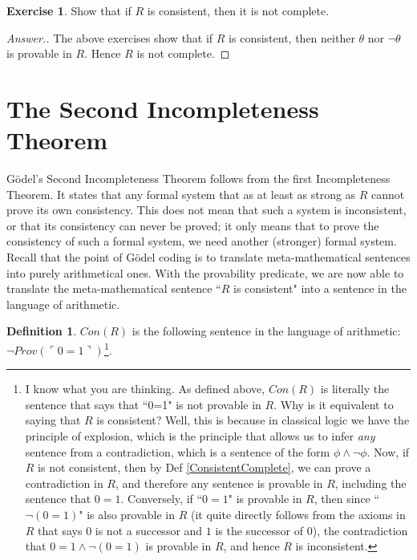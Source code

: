 \documentclass[11pt]{article}
\theoremstyle{definition}
\newtheorem{defn}{Definition}
\newtheorem{exer}{Exercise}
\begin{document}
\begin{exer}
Show that if $R$ is consistent, then it is not complete.
\end{exer}

\begin{proof}[Answer.]
The above exercises show that if $R$ is consistent, then neither $\theta$ nor $\neg \theta$ is provable in $R$. Hence $R$ is not complete.

\end{proof}

\section{The Second Incompleteness Theorem}

G\"odel's Second Incompleteness Theorem follows from the first Incompleteness Theorem. It states that any formal system that as at least as strong as $R$ cannot prove its own consistency. This does not mean that such a system is inconsistent, or that its consistency can never be proved; it only means that to prove the consistency of such a formal system, we need another (stronger) formal system. \\

Recall that the point of G\"odel coding is to translate meta-mathematical sentences into purely arithmetical ones. With the provability predicate, we are now able to translate the meta-mathematical sentence ``$R$ is consistent" into a sentence in the language of arithmetic.

\begin{defn}
$Con(R)$ is the following sentence in the language of arithmetic: $\neg Prov(\ulcorner 0 = 1 \urcorner)$\footnote{I know what you are thinking. As defined above, $Con(R)$ is literally the sentence that says that ``0=1" is not provable in $R$. Why is it equivalent to saying that $R$ is consistent? Well, this is because in classical logic we have the principle of explosion, which is the principle that allows us to infer \textit{any} sentence from a contradiction, which is a sentence of the form $\phi \land \neg \phi$. Now, if $R$ is not consistent, then by Def \ref{ConsistentComplete}, we can prove a contradiction in $R$, and therefore any sentence is provable in $R$, including the sentence that $0=1$. Conversely, if ``$0=1$" is provable in $R$, then since ``$\neg (0 = 1)$" is also provable in $R$ (it quite directly follows from the axioms in $R$ that says $0$ is not a successor and $1$ is the successor of $0$), the contradiction that $0=1 \land \neg (0 = 1)$ is provable in $R$, and hence $R$ is inconsistent.}.

\end{defn}
\end{document}
